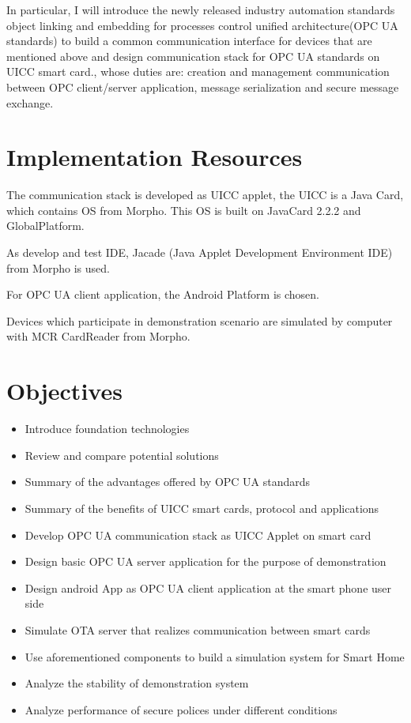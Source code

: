 \documentclass[]{llncs}
\begin{document}
In particular, I will introduce the newly released industry automation standards object linking and embedding for processes control unified architecture(OPC UA standards) to build a common communication interface for devices that are mentioned above and design communication stack for OPC UA standards on UICC smart card., whose  duties are: creation and management communication between OPC client/server application, message serialization and secure message exchange.


\section{Implementation Resources}
The communication stack  is developed as UICC applet, the UICC is a Java Card, which contains OS from Morpho. This OS is built on JavaCard 2.2.2 and GlobalPlatform.

\noindent As develop and test IDE, Jacade (Java Applet Development Environment IDE) from Morpho is used.

\noindent For OPC UA client application, the Android Platform is chosen.

\noindent Devices which participate in demonstration scenario  are simulated by computer with MCR CardReader from Morpho.

\section{Objectives}
\begin{itemize}
\item Introduce foundation technologies
\item Review and compare potential solutions
\item Summary of the advantages offered by OPC UA standards
\item Summary of the benefits of UICC smart cards, protocol and applications
\item Develop OPC UA communication stack as UICC Applet on smart card 
\item Design  basic OPC UA server application for the purpose of demonstration 
\item Design android App as OPC UA client application at the smart phone user side
\item Simulate OTA server that realizes communication between smart cards
\item Use aforementioned components to build a simulation system for Smart Home
\item Analyze the stability of demonstration system
\item Analyze performance of secure polices under different conditions
\end{itemize}
 
\end{document}
